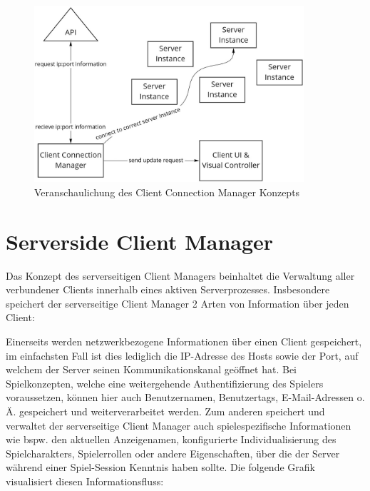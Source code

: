 \begin{figure}[H]
	\centering
	\includegraphics[width=100mm]{images/Client_Connection_Manager.jpg}
	\caption[Client Connection Manager Diagramm]{Veranschaulichung des Client Connection Manager Konzepts}
	\label{pic:Client_Connection_Manager}
\end{figure}

\section{Serverside Client Manager}

\label{serverside_client_manager}

Das Konzept des serverseitigen Client Managers beinhaltet die Verwaltung aller verbundener Clients innerhalb eines aktiven Serverprozesses. Insbesondere speichert der serverseitige Client Manager 2 Arten von Information über jeden Client:

Einerseits werden netzwerkbezogene Informationen über einen Client gespeichert, im einfachsten Fall ist dies lediglich die IP-Adresse des Hosts sowie der Port, auf welchem der Server seinen Kommunikationskanal geöffnet hat. Bei Spielkonzepten, welche eine weitergehende Authentifizierung des Spielers voraussetzen, können hier auch Benutzernamen, Benutzertags, E-Mail-Adressen o. Ä. gespeichert und weiterverarbeitet werden. Zum anderen speichert und verwaltet der serverseitige Client Manager auch spielespezifische Informationen wie bspw. den aktuellen Anzeigenamen, konfigurierte Individualisierung des Spielcharakters, Spielerrollen oder andere Eigenschaften, über die der Server während einer Spiel-Session Kenntnis haben sollte. Die folgende Grafik visualisiert diesen Informationsfluss:

